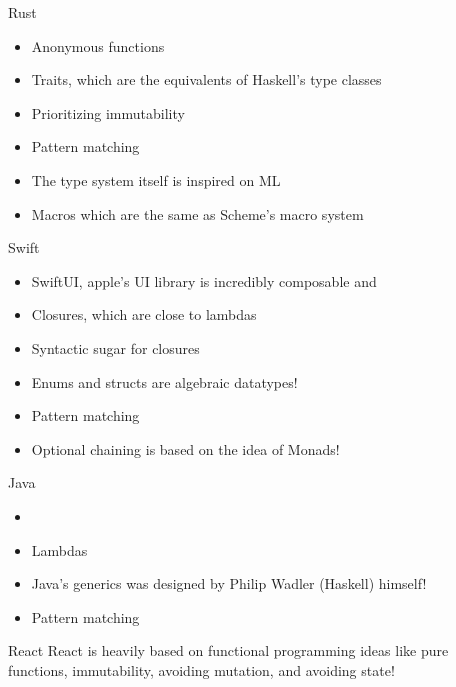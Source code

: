 \documentclass[pdf]{beamer}
\begin{document}
\begin{frame}{Rust}
  \begin{itemize}
  \item Anonymous functions
  \item Traits, which are the equivalents of Haskell's type classes
  \item Prioritizing immutability
  \item Pattern matching
  \item The type system itself is inspired on ML
  \item Macros which are the same as Scheme's macro system
  \end{itemize}
\end{frame}

\begin{frame}{Swift}
  \begin{itemize}
  \item SwiftUI, apple's UI library is incredibly composable and
  \item Closures, which are close to lambdas
  \item Syntactic sugar for closures
  \item Enums and structs are algebraic datatypes!
  \item Pattern matching
  \item Optional chaining is based on the idea of Monads!
  \end{itemize}
\end{frame}

\begin{frame}{Java}
  \begin{itemize}
  \item \item Lambdas
  \item Java's generics was designed by Philip Wadler (Haskell) himself!
  \item Pattern matching
  \end{itemize}
\end{frame}

\begin{frame}{React}
  React is heavily based on functional programming ideas like pure functions, immutability, avoiding mutation, and avoiding state!
\end{frame}
\end{document}

